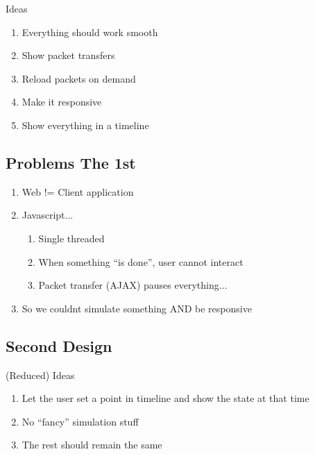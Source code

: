 \documentclass{beamer}
\begin{document}
\begin{frame}{Ideas}
 \begin{enumerate}
  \item Everything should work smooth
  \item Show packet transfers
  \item Reload packets on demand
  \item Make it responsive
  \item Show everything in a timeline
 \end{enumerate}
\end{frame}

\subsection{Problems The 1st}

\begin{frame}
 \begin{enumerate}
  \item Web != Client application
  \item Javascript...
  \begin{enumerate}
   \item Single threaded
   \item When something ``is done'', user cannot interact
   \item Packet transfer (AJAX) pauses everything...
  \end{enumerate}
  \item So we couldnt simulate something AND be responsive

 \end{enumerate}

\end{frame}

\subsection{Second Design}

\begin{frame}{(Reduced) Ideas}
 \begin{enumerate}
  \item Let the user set a point in timeline and show the state at that time
  \item No ``fancy'' simulation stuff
  \item The rest should remain the same
 \end{enumerate}

\end{frame}
\end{document}
